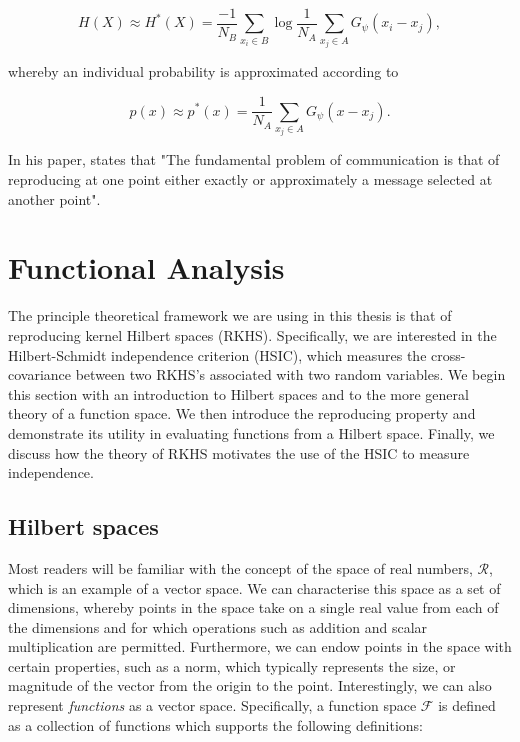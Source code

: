 \begin{equation}       
	H(X) \approx H^*(X) = \frac{-1}{N_B} \sum_{x_i \in B}{\log \frac{1}{N_A} \sum_{x_j \in A}{G_\psi(x_i - x_j)}},
\end{equation}

whereby an individual probability is approximated according to

\begin{equation}
	p(x) \approx p^*(x) = \frac{1}{N_A} \sum_{x_j \in A}{G_\psi(x - x_j)}.
\end{equation}

In his paper, \cite{shannon2001mathematical} states that "The fundamental problem of communication is that of reproducing at one point either exactly or approximately a message selected at another point".


\section{Functional Analysis}

The principle theoretical framework we are using in this thesis is that of reproducing kernel Hilbert spaces (RKHS). Specifically, we are interested in the Hilbert-Schmidt independence criterion (HSIC), which measures the cross-covariance between two RKHS's associated with two random variables. We begin this section with an introduction to Hilbert spaces and to the more general theory of a function space. We then introduce the reproducing property and demonstrate its utility in evaluating functions from a Hilbert space. Finally, we discuss how the theory of RKHS motivates the use of the HSIC to measure independence.  

\subsection{Hilbert spaces}

Most readers will be familiar with the concept of the space of real numbers, $\mathcal{R}$, which is an example of a vector space. We can characterise this space as a set of dimensions, whereby points in the space take on a single real value from each of the dimensions and for which operations such as addition and scalar multiplication are permitted. Furthermore, we can endow points in the space with certain properties, such as a norm, which typically represents the size, or magnitude of the vector from the origin to the point. Interestingly, we can also represent \textit{functions} as a vector space. Specifically, a function space $\mathcal{F}$ is defined as a collection of functions which supports the following definitions:

